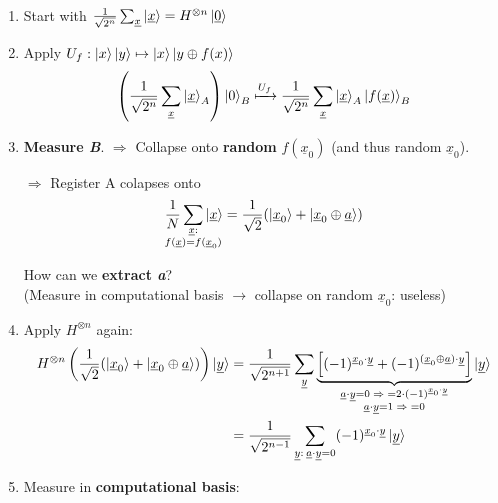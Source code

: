 \documentclass[a4paper, 12pt]{article}
\theoremstyle{plain}
\theoremstyle{definition}
\theoremstyle{remark}
\begin{document}
  \begin{enumerate}[label=(\roman*)]
    \item Start with $\frac{1}{\sqrt{2^n}}\sum_{\underline{x}}\ket{\underline{x}}=H^{\otimes n}\ket{\underline{0}}$
    \item Apply $U_f:\ket{x}\ket{y}\mapsto\ket{x}\ket{y\oplus f(x)}$
      \begin{equation*}
        \left(\frac{1}{\sqrt{2^n}}\sum_{\underline{x}}\ket{\underline{x}}_A\right)\ket{0}_B \xmapsto{U_f} \frac{1}{\sqrt{2^n}}\sum_{\underline{x}}\ket{\underline{x}}_A\ket{f(\underline{x})}_B
      \end{equation*}
    \item \textbf{Measure \emph{B}}. $\Longrightarrow$ Collapse onto \textbf{random} $f(\underline{x}_0)$ (and thus random $\underline{x}_0$).

      $\Longrightarrow$ Register A colapses onto
      \begin{equation*}
        \frac{1}{N} \sum_{\mathclap{\substack{\underline{x}:\\f(\underline{x})=f(\underline{x}_0)}}}\ket{\underline{x}} = \frac{1}{\sqrt{2}}(\ket{\underline{x}_0}+\ket{\underline{x}_0\oplus \underline{a}})
      \end{equation*}
      \begin{center}
        How can we \textbf{extract \emph{a}}?\\ \small
        (Measure in computational basis $\rightarrow$ collapse on random $\underline{x}_0$: useless)
      \end{center}
    \item Apply $H^{\otimes n}$ again:
      \begin{align*}
        H^{\otimes n} \left( \frac{1}{\sqrt{2}}(\ket{\underline{x}_0}+\ket{\underline{x}_0\oplus \underline{a}}) \right) \ket{\underline{y}}&= \frac{1}{\sqrt{2^{n+1}}}\sum_{\underline{y}}\underbrace{\left[(-1)^{\underline{x}_0\cdot \underline{y}}+(-1)^{(\underline{x}_0\oplus \underline{a})\cdot \underline{y}}\right]}_{\mathclap{\substack{\underline{a}\cdot \underline{y}=0\; \Rightarrow \; =2 \cdot (-1)^{\underline{x}_0\cdot \underline{y}}\\\underline{a}\cdot \underline{y}=1\; \Rightarrow \; =0}}}\ket{\underline{y}}\\
        &= \frac{1}{\sqrt{2^{n-1}}}\sum_{\underline{y}:\:\underline{a}\cdot \underline{y}=0}(-1)^{\underline{x}_0\cdot \underline{y}}\ket{\underline{y}}
      \end{align*}
    \item Measure in \textbf{computational basis}:


\end{enumerate}
\end{document}
